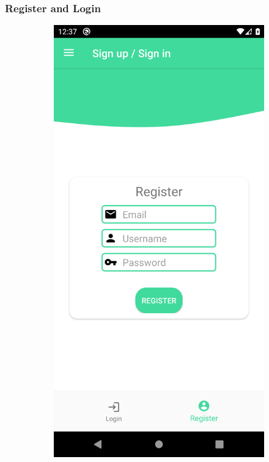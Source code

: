 \subsubsection{Register and Login}

\begin{figure}[H]
    \captionsetup[subfigure]{justification=centering}
    \begin{center}
        \begin{subfigure}{.3\textwidth}
            \includegraphics[scale=0.1, width=\textwidth]{_figures/register.png}

\end{subfigure}
\end{center}
\end{figure}

